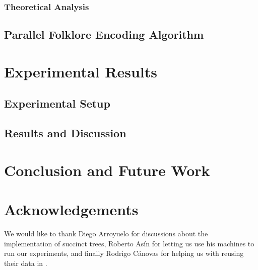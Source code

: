 \documentclass[runningheads]{llncs}
\begin{document}
\subsubsection{Theoretical Analysis}
\label{subsec:theoreticalAnalysis}


%

\subsection{Parallel Folklore Encoding Algorithm}
\label{subsec:parenthesesAlgorithm}


\section{Experimental Results}
\label{sec:exps}


\subsection{Experimental Setup}
\label{subsec:experimentalSetup}


\subsection{Results and Discussion}
\label{subsec:resultsDiscussion}



\section{Conclusion and Future Work}
\label{sec:conclusion}


\section*{Acknowledgements}

We would like to thank Diego Arroyuelo for discussions about the
implementation of succinct trees, Roberto As\'{i}n for letting us use
his machines to run our experiments, and finally Rodrigo C\'{a}novas
for helping us with reusing their data in
\cite{Navarro:2014:FFS:2620785.2601073}.



\end{document}

